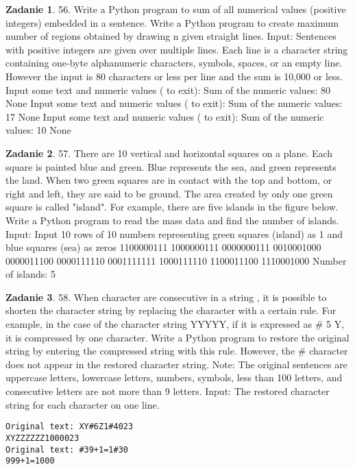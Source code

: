 \documentclass[11pt]{article}
\theoremstyle{definition}
\newtheorem{zadanie}{Zadanie}
\begin{document}
\begin{zadanie}


56. Write a Python program to sum of all numerical values (positive integers) embedded in a sentence.
Write a Python program to create maximum number of regions obtained by drawing n given straight lines. 
Input:
Sentences with positive integers are given over multiple lines. Each line is a character string containing one-byte alphanumeric characters, symbols, spaces, or an empty line. However the input is 80 characters or less per line and the sum is 10,000 or less.
Input some text and numeric values ( to exit):
Sum of the numeric values: 80
None
Input some text and numeric values ( to exit):
Sum of the numeric values: 17
None
Input some text and numeric values ( to exit):
Sum of the numeric values: 10
None

\end{zadanie}

\begin{zadanie}


57. There are 10 vertical and horizontal squares on a plane. Each square is painted blue and green. Blue represents the sea, and green represents the land. When two green squares are in contact with the top and bottom, or right and left, they are said to be ground. The area created by only one green square is called "island". For example, there are five islands in the figure below.
Write a Python program to read the mass data and find the number of islands. 
Input:
Input 10 rows of 10 numbers representing green squares (island) as 1 and blue squares (sea) as zeros
1100000111
1000000111
0000000111
0010001000
0000011100
0000111110
0001111111
1000111110
1100011100
1110001000
Number of islands:
5

\end{zadanie}

\begin{zadanie}


58. When character are consecutive in a string , it is possible to shorten the character string by replacing the character with a certain rule. For example, in the case of the character string YYYYY, if it is expressed as \# 5 Y, it is compressed by one character.
Write a Python program to restore the original string by entering the compressed string with this rule. However, the \# character does not appear in the restored character string. 
Note: The original sentences are uppercase letters, lowercase letters, numbers, symbols, less than 100 letters, and consecutive letters are not more than 9 letters.
Input:
The restored character string for each character on one line.
\begin{verbatim}
Original text: XY#6Z1#4023
XYZZZZZZ1000023
Original text: #39+1=1#30
999+1=1000
\end{verbatim}
\end{zadanie}
\end{document}
